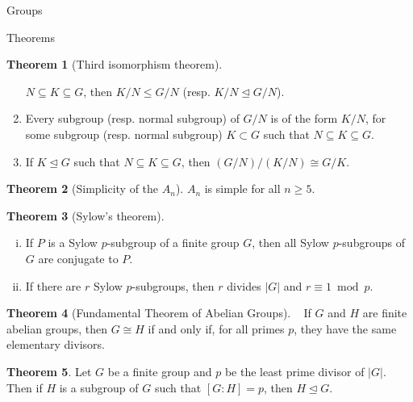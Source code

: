 \documentclass{article}
\theoremstyle{definition}
\newtheorem{theorem}{Theorem}
\numberwithin{theorem}{subsection} %
\theoremstyle{remark}
\theoremstyle{definition}
\begin{document}
\begin{section}{Groups}
\begin{subsection}{Theorems}
\begin{theorem}[Third isomorphism theorem]
\begin{enumerate}
        $N \subseteq K \subseteq G$, then $K/N \leq G/N$
        (resp. $K/N \trianglelefteq G/N$).
        \item Every subgroup (resp. normal subgroup) of $G/N$ is of the form
        $K/N$, for some subgroup (resp. normal subgroup) $K \subset G$ such that
        $N \subseteq K \subseteq G$.
        \item If $K \trianglelefteq G$ such that $N \subseteq K \subseteq G$,
        then $(G/N)/(K/N) \cong G/K$.
      \end{enumerate}
    \end{theorem}
    \begin{theorem}[Simplicity of the $A_n$] %
      $A_n$ is simple for all $n \geq 5$.
    \end{theorem}
    \begin{theorem}[Sylow's theorem] ~ %
      \begin{enumerate}[(i)]
        \item If $P$ is a Sylow $p$-subgroup of a finite group $G$, then all
        Sylow $p$-subgroups of $G$ are conjugate to $P$.
        \item If there are $r$ Sylow $p$-subgroups, then $r$ divides $|G|$ and
        $r \equiv 1 \bmod p$.
      \end{enumerate}
    \end{theorem}
    \begin{theorem}[Fundamental Theorem of Abelian Groups] ~ %
      If $G$ and $H$ are finite abelian groups, then $G \cong H$ if and only if,
      for all primes $p$, they have the same elementary divisors.
    \end{theorem}
    \begin{theorem} %
      Let $G$ be a finite group and $p$ be the least prime divisor of $|G|$.
      Then if $H$ is a subgroup of $G$ such that $[G: H] = p$,
      then $H \trianglelefteq G$.
    \end{theorem}
  \end{subsection}
\end{section}
\pagebreak
\end{document}
